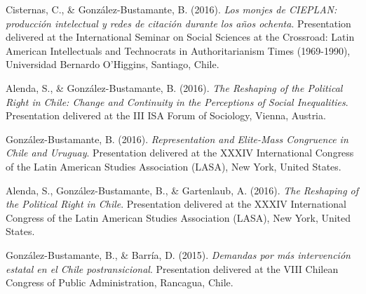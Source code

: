 \begin{publications}
\begin{benumerate}{87}

\item{Cisternas, C., \& González-Bustamante, B. (2016). {\itshape Los monjes de CIEPLAN: producción intelectual y redes de citación durante los años ochenta}. Presentation delivered at the International Seminar on Social Sciences at the Crossroad: Latin American Intellectuals and Technocrats in Authoritarianism Times (1969-1990), Universidad Bernardo O'Higgins, Santiago, Chile.}\vspace{1mm}

\item{Alenda, S., \& González-Bustamante, B. (2016). {\itshape The Reshaping of the Political Right in Chile: Change and Continuity in the Perceptions of Social Inequalities}. Presentation delivered at the III ISA Forum of Sociology, Vienna, Austria.}\vspace{1mm}

\item{González-Bustamante, B. (2016). {\itshape Representation and Elite-Mass Congruence in Chile and Uruguay}. Presentation delivered at the XXXIV International Congress of the Latin American Studies Association (LASA), New York, United States.}\vspace{1mm}

\item{Alenda, S., González-Bustamante, B., \& Gartenlaub, A. (2016). {\itshape The Reshaping of the Political Right in Chile}. Presentation delivered at the XXXIV International Congress of the Latin American Studies Association (LASA), New York, United States.}\vspace{1mm}


\item{González-Bustamante, B., \& Barría, D. (2015). {\itshape Demandas por más intervención estatal en el Chile postransicional}. Presentation delivered at the VIII Chilean Congress of Public Administration, Rancagua, Chile.}\vspace{1mm}


\end{benumerate}
\end{publications}
